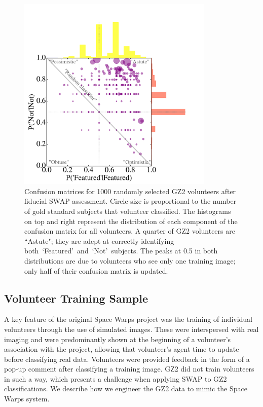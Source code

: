 \documentclass[twocolumn]{aastex6}
\newcommand{\feat}{`Featured'}
\newcommand{\notfeat}{`Not'}
\begin{document}
\begin{figure}[t!]
\includegraphics[width=3.7in]{figures/volunteer_confusion_matrix.pdf}
\caption{Confusion matrices for 1000 randomly selected GZ2 volunteers after fiducial SWAP assessment. Circle size is proportional to the number of gold standard subjects that volunteer classified. The histograms on top and right represent the distribution of each component of the confusion matrix for all volunteers.  A quarter of GZ2 volunteers are ``Astute"; they are adept at correctly identifying both~\feat~and~\notfeat~subjects. The peaks at 0.5 in both distributions are due to volunteers who see only one training image; only half of their confusion matrix is updated. \label{fig: volunteer training}}
\end{figure}

\subsection{Volunteer Training Sample}\label{sec: training sample}

A key feature of the original Space Warps project was the training of 
individual volunteers through the use of simulated images.
These were interspersed with real imaging and were 
predominantly shown at the beginning of a volunteer's association with the project, 
allowing that volunteer's agent time to update before classifying real data. 
Volunteers were provided feedback in the form of a pop-up comment after
classifying a training image. GZ2 did not train volunteers in such a way, which
presents a challenge when applying SWAP to GZ2 classifications. 
We describe how we engineer the GZ2 data to mimic the Space 
Warps system.
\end{document}
